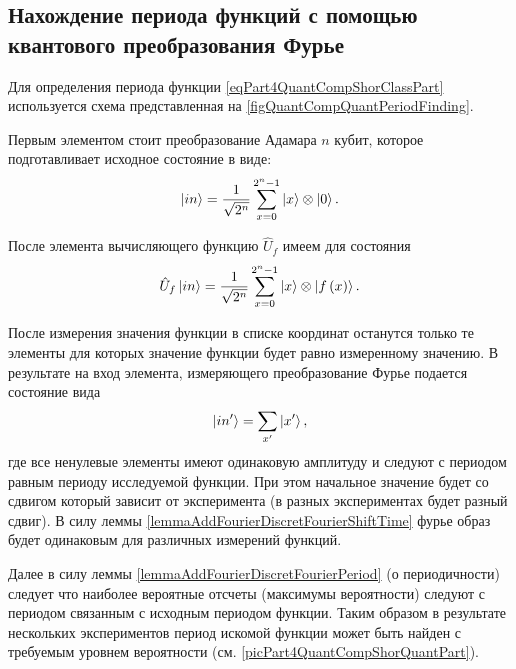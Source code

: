 \subsection{Нахождение периода функций с помощью квантового
  преобразования Фурье}

Для определения периода функции \eqref{eqPart4QuantCompShorClassPart}
используется схема представленная на
\autoref{figQuantCompQuantPeriodFinding}.



Первым элементом стоит преобразование Адамара $n$ кубит, которое
подготавливает исходное состояние в виде:
\begin{equation}
\ket{in} = \frac{1}{\sqrt{2^n}}\sum_{x=0}^{2^n - 1} \ket{x}
\otimes\ket{0}.
\nonumber
\end{equation}

После элемента вычисляющего функцию $\hat{U}_f$ имеем для состояния
\begin{equation}
\hat{U}_f\ket{in} = \frac{1}{\sqrt{2^n}}\sum_{x=0}^{2^n - 1} \ket{x}
\otimes\left|f\left(x\right)\right>.
\nonumber
\end{equation} 



После измерения значения функции в списке координат останутся только
те элементы для которых значение функции будет равно измеренному
значению. В результате на вход элемента, измеряющего преобразование
Фурье подается состояние вида 
\begin{equation}
\ket{in'} = \sum_{x'} \ket{x'},
\nonumber
\end{equation} 
где все ненулевые элементы имеют одинаковую амплитуду и следуют с
периодом равным периоду исследуемой функции. При этом начальное
значение будет со сдвигом который зависит от эксперимента (в разных
экспериментах будет разный сдвиг). В силу леммы
\ref{lemmaAddFourierDiscretFourierShiftTime} фурье образ будет
одинаковым для различных измерений функций.

Далее в силу леммы \ref{lemmaAddFourierDiscretFourierPeriod}
(о периодичности) следует что наиболее вероятные отсчеты (максимумы
вероятности) следуют с периодом связанным с исходным периодом
функции. Таким образом в результате нескольких экспериментов период
искомой функции может быть найден с требуемым уровнем вероятности
(см. \autoref{picPart4QuantCompShorQuantPart}).

